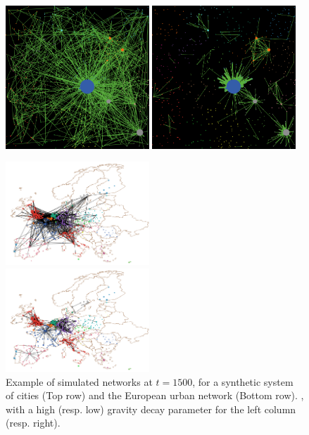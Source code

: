 \documentclass[11pt]{article}
\begin{document}
\begin{figure}
    \includegraphics[width=0.48\textwidth]{figures/ex_alleq-highgravity_seed-12102_t1500.png}
    \includegraphics[width=0.48\textwidth]{figures/ex_alleq-lowgravity_seed-12102_t1500.png}\\
    \begin{mdframed}
    \includegraphics[width=0.48\textwidth]{figures/ex_real_highgravity_t1500.png}
    \end{mdframed}
    \begin{mdframed}
    \includegraphics[width=0.48\textwidth]{figures/ex_real_lowgravity_t1500.png}
    \end{mdframed}
    \caption{Example of simulated networks at $t=1500$, for a synthetic system of cities (Top row) and the European urban network (Bottom row). , with a high (resp. low) gravity decay parameter for the left column (resp. right).\label{fig:example}}
\end{figure}
\end{document}
